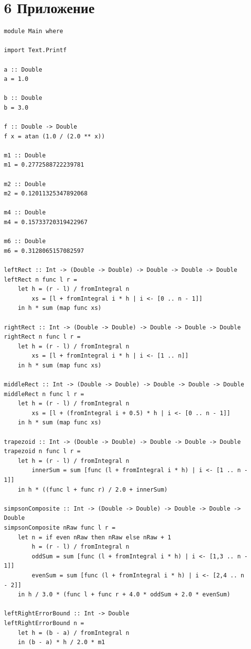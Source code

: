 \documentclass[14pt,a4paper]{extarticle}
\begin{document}
\section*{6 Приложение}
\begin{lstlisting}[caption={Файл Main.hs}, label={lst:lab6code}]
module Main where

import Text.Printf

a :: Double
a = 1.0

b :: Double
b = 3.0

f :: Double -> Double
f x = atan (1.0 / (2.0 ** x))

m1 :: Double
m1 = 0.2772588722239781

m2 :: Double
m2 = 0.12011325347892068

m4 :: Double
m4 = 0.15733720319422967

m6 :: Double
m6 = 0.3128065157082597

leftRect :: Int -> (Double -> Double) -> Double -> Double -> Double
leftRect n func l r =
    let h = (r - l) / fromIntegral n
        xs = [l + fromIntegral i * h | i <- [0 .. n - 1]]
    in h * sum (map func xs)

rightRect :: Int -> (Double -> Double) -> Double -> Double -> Double
rightRect n func l r =
    let h = (r - l) / fromIntegral n
        xs = [l + fromIntegral i * h | i <- [1 .. n]]
    in h * sum (map func xs)

middleRect :: Int -> (Double -> Double) -> Double -> Double -> Double
middleRect n func l r =
    let h = (r - l) / fromIntegral n
        xs = [l + (fromIntegral i + 0.5) * h | i <- [0 .. n - 1]]
    in h * sum (map func xs)

trapezoid :: Int -> (Double -> Double) -> Double -> Double -> Double
trapezoid n func l r =
    let h = (r - l) / fromIntegral n
        innerSum = sum [func (l + fromIntegral i * h) | i <- [1 .. n - 1]]
    in h * ((func l + func r) / 2.0 + innerSum)

simpsonComposite :: Int -> (Double -> Double) -> Double -> Double -> Double
simpsonComposite nRaw func l r =
    let n = if even nRaw then nRaw else nRaw + 1
        h = (r - l) / fromIntegral n
        oddSum = sum [func (l + fromIntegral i * h) | i <- [1,3 .. n - 1]]
        evenSum = sum [func (l + fromIntegral i * h) | i <- [2,4 .. n - 2]]
    in h / 3.0 * (func l + func r + 4.0 * oddSum + 2.0 * evenSum)

leftRightErrorBound :: Int -> Double
leftRightErrorBound n =
    let h = (b - a) / fromIntegral n
    in (b - a) * h / 2.0 * m1


\end{lstlisting}
\end{document}
